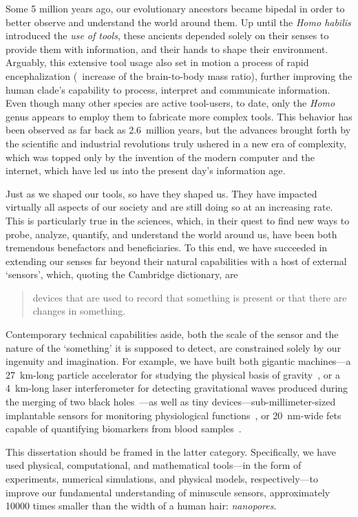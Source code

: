 Some 5 million years ago, our evolutionary ancestors became bipedal in order to better observe and understand
the world around them. Up until the \textit{Homo habilis} introduced the \emph{use of tools}, these ancients
depended solely on their senses to provide them with information, and their hands to shape their environment.
Arguably, this extensive tool usage also set in motion a process of rapid encephalization (\ie~increase of the
brain-to-body mass ratio), further improving the human clade's capability to process, interpret and
communicate information. Even though many other species are active tool-users, to date, only the \textit{Homo}
genus appears to employ them to fabricate more complex tools. This behavior has been observed as far back as
2.6~million years, but the advances brought forth by the scientific and industrial revolutions truly ushered
in a new era of complexity, which was topped only by the invention of the modern computer and the internet,
which have led us into the present day's information age.

Just as we shaped our tools, so have they shaped us. They have impacted virtually all aspects of our society
and are still doing so at an increasing rate. This is particularly true in the sciences, which, in their quest
to find new ways to probe, analyze, quantify, and understand the world around us, have been both tremendous
benefactors and beneficiaries. To this end, we have succeeded in extending our senses far beyond their natural
capabilities with a host of external `sensors', which, quoting the Cambridge dictionary, are
%
\begin{quote}
  devices that are used to record that something is present or that there are changes in something.
\end{quote}
%
Contemporary technical capabilities aside, both the scale of the sensor and the nature of the `something' it
is supposed to detect, are constrained solely by our ingenuity and imagination. For example, we have built
both gigantic machines---a \SI{27}{\kilo\meter}-long particle accelerator for studying the physical basis of
gravity~\cite{ATLAS-2012}, or a \SI{4}{\kilo\meter}-long laser interferometer for detecting gravitational
waves produced during the merging of two black holes~\cite{Abbott-2016}---as well as tiny
devices---sub-millimeter-sized implantable sensors for monitoring physiological functions~\cite{Dong-2019}, or
\SI{20}{\nm}-wide \glspl{fet} capable of quantifying biomarkers from blood samples~\cite{Krivitsky-2016}.

This dissertation should be framed in the latter category. Specifically, we have used physical, computational,
and mathematical tools---in the form of experiments, numerical simulations, and physical models,
respectively---to improve our fundamental understanding of minuscule sensors, approximately \num{10000} times
smaller than the width of a human hair: \emph{nanopores}.


